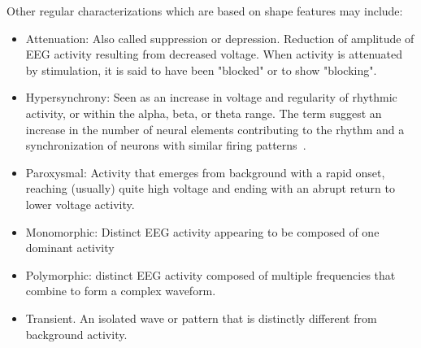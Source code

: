 Other regular characterizations which are based on shape features may include:

\begin{itemize}
\item Attenuation: Also called suppression or depression. Reduction of amplitude of EEG activity resulting from decreased voltage. When activity is attenuated by stimulation, it is said to have been "blocked" or to show "blocking".
\item Hypersynchrony: Seen as an increase in voltage and regularity of rhythmic activity, or within the alpha, beta, or theta range. The term suggest an increase in the number of neural elements contributing to the rhythm and a synchronization of neurons with similar firing patterns~\cite{Buzsaki2012}.
\item Paroxysmal: Activity that emerges from background with a rapid onset, reaching (usually) quite high voltage and ending with an abrupt return to lower voltage activity. 
\end{itemize}

\begin{itemize}
\item Monomorphic: Distinct EEG activity appearing to be composed of one dominant activity
\item Polymorphic: distinct EEG activity composed of multiple frequencies that combine to form a complex waveform.
\item Transient. An isolated wave or pattern that is distinctly different from background activity.
\end{itemize}


